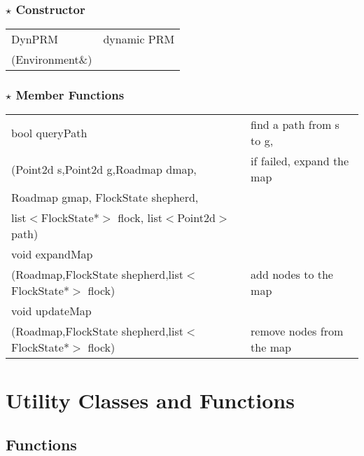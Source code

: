 \documentclass[onecolumn,10pt]{article}
\begin{document}
\subsubsection*{$\star$ Constructor}
\begin{tabular}{l|l}
DynPRM              &  dynamic PRM \\
(Environment\&)
\end{tabular}

\subsubsection*{$\star$ Member Functions}

\begin{tabular}{l|l}
bool queryPath                                         & find a path from s to g,\\
(Point2d s,Point2d g,Roadmap dmap,                     & if failed, expand the map\\
               Roadmap gmap, FlockState shepherd,      & \\
	       list$<$FlockState*$>$ flock, list$<$Point2d$>$ path) &   \\\hline
	      
void expandMap                                             & \\
(Roadmap,FlockState shepherd,list$<$FlockState*$>$ flock) & add nodes to the map \\\hline

void updateMap & \\
(Roadmap,FlockState shepherd,list$<$FlockState*$>$ flock) & remove nodes from the map 

\end{tabular}

\section{Utility Classes and Functions}


\subsection{Functions}
\end{document}
